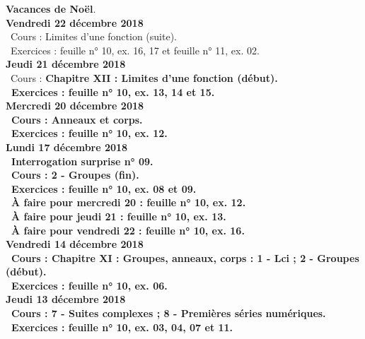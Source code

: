 \documentclass[12pt,a4paper]{article}
\begin{document}
\noindent\textbf{\bf Vacances de Noël}.\vspace{.4cm}\\

\noindent\textbf{Vendredi 22 décembre 2018}\\ 
\bu\ Cours : Limites d'une fonction (suite).\\
\bu\ Exercices : feuille n° 10, ex. 16, 17 et feuille n° 11, ex. 02.\vspace{.4cm}\\
 
\noindent\textbf{Jeudi 21 décembre 2018}\\
\bu\ Cours : \bf Chapitre XII \rm : Limites d'une fonction (début).\\
\bu\ Exercices : feuille n° 10, ex. 13, 14 et 15.\vspace{.4cm}\\
 
\noindent\textbf{\bf Mercredi 20 décembre 2018}\\
\bu\ Cours : Anneaux et corps.\\ 
\bu\ Exercices : feuille n° 10, ex. 12.\vspace{.4cm}\\
 
\noindent\textbf{Lundi 17 décembre 2018}\\
\bu\ Interrogation surprise n° 09.\\
\bu\ Cours : 2 - Groupes (fin).\\ 
\bu\ Exercices : feuille n° 10, ex. 08 et 09.\\
\bu\ À faire pour mercredi 20 : feuille n° 10, ex. 12.\\
\bu\ À faire pour jeudi 21 : feuille n° 10, ex. 13.\\
\bu\ À faire pour vendredi 22 : feuille n° 10, ex. 16.\vspace{.4cm}\\ 

\noindent\textbf{Vendredi 14 décembre 2018}\\
\bu\ Cours : \bf Chapitre XI \rm : Groupes, anneaux, corps  : 1 - Lci ; 2 - Groupes (début).\\ 
\bu\ Exercices : feuille n° 10, ex. 06.\vspace{.4cm}\\
 
\noindent\textbf{Jeudi 13 décembre 2018}\\
\bu\ Cours : 7 - Suites complexes ; 8 - Premières séries numériques.\\
\bu\ Exercices : feuille n° 10, ex. 03, 04, 07 et 11.\vspace{.4cm}\\
 
\end{document}
